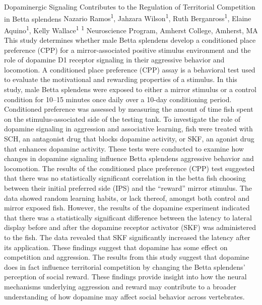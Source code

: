 \makeabstract
    {
    Dopaminergic Signaling Contributes to the Regulation of Territorial Competition in Betta splendens
    }
    {
    Nazario Ramos\textsuperscript{1}, Jahzara Wilson\textsuperscript{1}, Ruth Berganross\textsuperscript{1}, Elaine Aquino\textsuperscript{1}, Kelly Wallace\textsuperscript{1}
    }
    {
    \textsuperscript{1} Neuroscience Program, Amherst College, Amherst, MA
    }
    {
    This study determines whether male Betta splendens develop a conditioned place preference (CPP) for a mirror-associated positive stimulus environment and the role of dopamine D1 receptor signaling in their aggressive behavior and locomotion.
    }
    {
    A conditioned place preference (CPP) assay is a behavioral test used to evaluate the motivational and rewarding properties of a stimulus. In this study, male Betta splendens were exposed to either a mirror stimulus or a control condition for 10--15 minutes once daily over a 10-day conditioning period. Conditioned preference was assessed by measuring the amount of time fish spent on the stimulus-associated side of the testing tank. To investigate the role of dopamine signaling in aggression and associative learning, fish were treated with SCH, an antagonist drug that blocks dopamine activity, or SKF, an agonist drug that enhances dopamine activity. These tests were conducted to examine how changes in dopamine signaling influence Betta splendens aggressive behavior and locomotion. 
    }
    {
    The results of the conditioned place preference (CPP) test suggested that there was no statistically significant correlation in the betta fish choosing between their initial preferred side (IPS) and the {\textquotedblleft}reward{\textquotedblright} mirror stimulus. The data showed random learning habits, or lack thereof, amongst both control and mirror exposed fish. However, the results of the dopamine experiment indicated that there was a statistically significant difference between the latency to lateral display before and after the dopamine receptor activator (SKF) was administered to the fish. The data revealed that SKF significantly increased the latency after its application. These findings suggest that dopamine has some effect on competition and aggression. 
    }
    {
    The results from this study suggest that dopamine does in fact influence territorial competition by changing the Betta splendens{\textquoteright} perception of social reward. These findings provide insight into how the neural mechanisms underlying aggression and reward may contribute to a broader understanding of how dopamine may affect social behavior across vertebrates.  
    }

    \newpage
    
